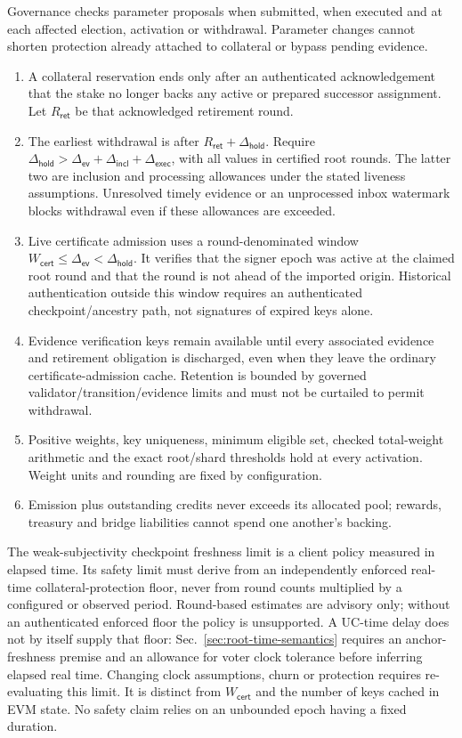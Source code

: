 Governance checks parameter proposals when submitted, when executed and at each affected election, activation or withdrawal. Parameter changes cannot shorten protection already attached to collateral or bypass pending evidence.
\begin{enumerate}
 \item A collateral reservation ends only after an authenticated acknowledgement that the stake no longer backs any active or prepared successor assignment. Let $R_\mathsf{ret}$ be that acknowledged retirement round.
 \item The earliest withdrawal is after $R_\mathsf{ret}+\Delta_\mathsf{hold}$. Require $\Delta_\mathsf{hold}>\Delta_\mathsf{ev}+\Delta_\mathsf{incl}+\Delta_\mathsf{exec}$, with all values in certified root rounds. The latter two are inclusion and processing allowances under the stated liveness assumptions. Unresolved timely evidence or an unprocessed inbox watermark blocks withdrawal even if these allowances are exceeded.
 \item Live certificate admission uses a round-denominated window $W_\mathsf{cert}\le\Delta_\mathsf{ev}<\Delta_\mathsf{hold}$. It verifies that the signer epoch was active at the claimed root round and that the round is not ahead of the imported origin. Historical authentication outside this window requires an authenticated checkpoint/ancestry path, not signatures of expired keys alone.
 \item Evidence verification keys remain available until every associated evidence and retirement obligation is discharged, even when they leave the ordinary certificate-admission cache. Retention is bounded by governed validator/transition/evidence limits and must not be curtailed to permit withdrawal.
 \item Positive weights, key uniqueness, minimum eligible set, checked total-weight arithmetic and the exact root/shard thresholds hold at every activation. Weight units and rounding are fixed by configuration.
 \item Emission plus outstanding credits never exceeds its allocated pool; rewards, treasury and bridge liabilities cannot spend one another's backing.
\end{enumerate}

The weak-subjectivity checkpoint freshness limit is a client policy measured in elapsed time. Its safety limit must derive from an independently enforced real-time collateral-protection floor, never from round counts multiplied by a configured or observed period. Round-based estimates are advisory only; without an authenticated enforced floor the policy is unsupported. A UC-time delay does not by itself supply that floor: Sec.~\ref{sec:root-time-semantics} requires an anchor-freshness premise and an allowance for voter clock tolerance before inferring elapsed real time. Changing clock assumptions, churn or protection requires re-evaluating this limit. It is distinct from $W_\mathsf{cert}$ and the number of keys cached in EVM state. No safety claim relies on an unbounded epoch having a fixed duration.

